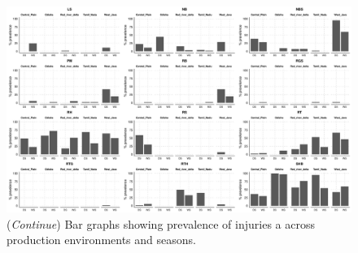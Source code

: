  \begin{landscape}
\begin{figure}
\centering
\includegraphics[height = 1\textwidth]{figures/barplot2/barplot2.pdf}
\caption[\textit{Continue}]{(\textit{Continue}) Bar graphs showing  prevalence of injuries a across production environments and seasons.}
\label{fig:barplot2}
\end{figure}\end{landscape} 

